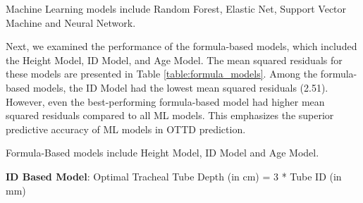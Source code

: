 \documentclass[11pt]{article}
\begin{document}
\begin{table}[h]
\caption{Comparison of mean squared residuals for each Machine Learning Models}
\label{table:ml_models}
\begin{threeparttable}
\renewcommand{\TPTminimum}{\linewidth}
\begin{tablenotes}
\footnotesize
\item Machine Learning models include Random Forest, Elastic Net, Support Vector Machine and Neural Network.
\end{tablenotes}
\end{threeparttable}
\end{table}


Next, we examined the performance of the formula-based models, which included the Height Model, ID Model, and Age Model. The mean squared residuals for these models are presented in Table \ref{table:formula_models}. Among the formula-based models, the ID Model had the lowest mean squared residuals (2.51). However, even the best-performing formula-based model had higher mean squared residuals compared to all ML models. This emphasizes the superior predictive accuracy of ML models in OTTD prediction.

\begin{table}[h]
\caption{Comparison of mean squared residuals for each Formula-Based Models}
\label{table:formula_models}
\begin{threeparttable}
\renewcommand{\TPTminimum}{\linewidth}
\begin{tablenotes}
\footnotesize
\item Formula-Based models include Height Model, ID Model and Age Model.
\item \textbf{ID Based Model}: Optimal Tracheal Tube Depth (in cm) = 3 * Tube ID (in mm)
\end{tablenotes}
\end{threeparttable}
\end{table}
\end{document}
